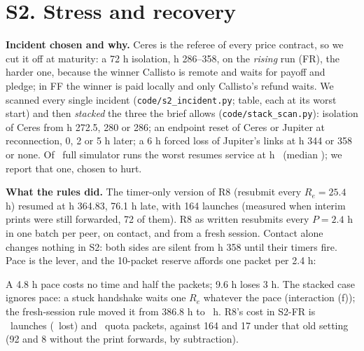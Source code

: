 \section*{S2. Stress and recovery}

\textbf{Incident chosen and why.} Ceres is the referee of every price contract, so we cut it off at maturity: a 72 h isolation, h 286--358, on the \emph{rising} run (FR), the
harder one, because the winner Callisto is remote and waits for payoff and pledge; in FF the winner is paid locally and only Callisto's refund waits. We scanned every
single incident (\texttt{code/s2\_incident.py}; table, each at its worst start) and then \emph{stacked} the three the brief allows (\texttt{code/stack\_scan.py}): isolation of
Ceres from h 272.5, 280 or 286; an endpoint reset of Ceres or Jupiter at reconnection, 0, 2 or 5 h later; a 6 h forced loss of Jupiter's links at h 344 or 358 or none. Of
\StackCombos\ full simulator runs the worst resumes service at h \StackWorstH\ (median \StackMedianH); we report that one, chosen to hurt.
\begin{center}\end{center}
\begin{center}\end{center}

\textbf{What the rules did.} The timer-only version of R8 (resubmit every $R_e = 25.4$ h) resumed at h 364.83, 76.1 h late, with 164 launches (measured when interim prints were still forwarded, 72 of them). R8 as written resubmits every
$P = 2.4$ h in one batch per peer, on contact, and from a fresh session. Contact alone changes nothing in S2: both sides are silent from h 358 until their timers fire. Pace is the lever,
and the 10-packet reserve affords one packet per 2.4 h:
\begin{center}\end{center}
A 4.8 h pace costs no time and half the packets; 9.6 h loses 3 h. The stacked case ignores pace: a stuck handshake waits one $R_e$ whatever the pace (interaction (f)); the
fresh-session rule moved it from 386.8 h to \SimStackSpendable\ h. R8's cost in S2-FR is \SimSTwoFRPackets\ launches (\SimSTwoFRFailed\ lost) and \SimSTwoFRQuota\ quota packets, against 164 and 17 under that old setting (92 and 8 without the print forwards, by subtraction).


